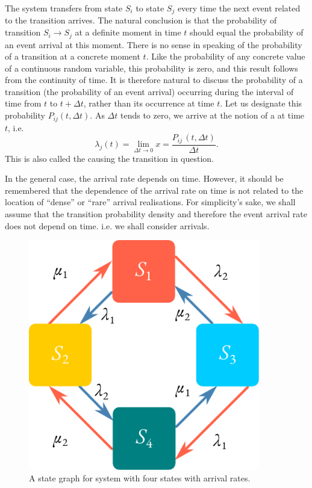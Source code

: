 The system transfers from state $S_{i}$ to state $S_{j}$ every time
the next event related to the transition arrives. The natural
conclusion is that the probability of transition $S_{i} \to S_{j}$ at
a definite moment in time $t$ should equal the probability of an event
arrival at this moment. There is no sense in speaking of the
probability of a transition at a concrete moment $t$. Like the
probability of any concrete value of a continuous random variable,
this probability is zero, and this result follows from the continuity
of time. It is therefore natural to discuss the probability of a
transition (the probability of an event arrival) occurring during the
interval of time from $t$ to $t+ \Delta t$, rather than its occurrence
at time $t$. Let us designate this probability $P_{ij}(t, \Delta
t)$. As $\Delta t$ tends to zero, we arrive at the notion of a
 at time $t$, i.e. 
\begin{equation}%
\lambda_{j} (t) = \lim_{\Delta t \rightarrow 0} x =  \frac{P_{ij}\,(
  t, \Delta t)}{\Delta t}.
\label{eq-2.1}
\end{equation}
This is also called the  causing the transition in
question.

In the general case, the arrival rate depends on time. However, it should
be remembered that the dependence of the arrival rate on time is
not related to the location of ``dense'' or ``rare'' arrival realisations. For
simplicity's sake, we shall assume that the transition probability density
and therefore the event arrival rate does not depend on time. i.e. we
shall consider  arrivals.


 \begin{figure}%
 \centering
 \includegraphics[width=0.9\textwidth]{figures/state-graph2.pdf}
\caption{A state graph for system with four states with arrival rates.
\label{state-graph2}}
 \end{figure}
 
